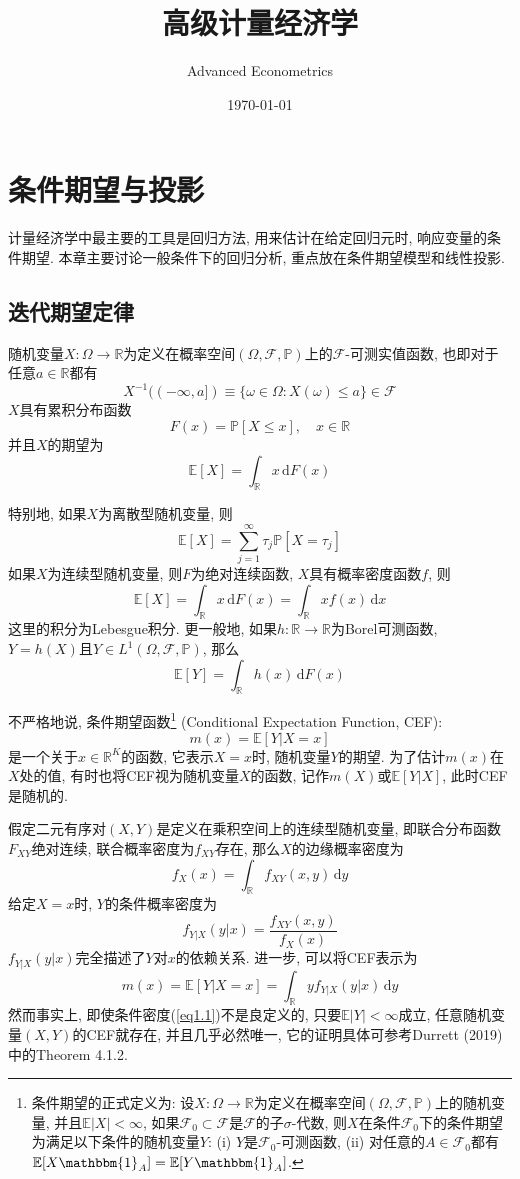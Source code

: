 \documentclass[cn, 12pt, math=mtpro2, bibstyle=apa, blue, twocol]{elegantbook}
\title{高级计量经济学}
\subtitle{Advanced Econometrics}
\date{\today}
\newcommand{\F}{\mathscr{F}}
\newcommand{\R}{\mathbb{R}}
\newcommand{\E}{\mathbb{E}}
\newcommand{\PP}{\mathbb{P}}
\begin{document}
\maketitle
\frontmatter

\tableofcontents

\mainmatter
\chapter{条件期望与投影}
计量经济学中最主要的工具是回归方法, 用来估计在给定回归元时, 响应变量的条件期望. 本章主要讨论一般条件下的回归分析, 重点放在条件期望模型和线性投影.
\section{迭代期望定律}
随机变量$X:\Omega\to\R$为定义在概率空间$(\Omega,\F,\PP)$上的$\F$-可测实值函数, 也即对于任意$a\in\R$都有
$$X^{-1}((-\infty,a])\equiv \{\omega\in\Omega: X(\omega)\leq a\}\in\F$$
$X$具有累积分布函数
$$F(x)=\PP[X\leq x],\quad x\in\R$$
并且$X$的期望为
$$\E[X]=\int_\R x\,\text{d}F(x)$$

特别地, 如果$X$为离散型随机变量, 则
$$\E[X]=\sum_{j=1}^{\infty}\tau_j\PP[X=\tau_j]$$
如果$X$为连续型随机变量, 则$F$为绝对连续函数, $X$具有概率密度函数$f$, 则
$$\E[X]=\int_\R x\,\text{d}F(x)=\int_\R xf(x)\,\text{d}x$$
这里的积分为Lebesgue积分. 更一般地, 如果$h:\R\to\R$为Borel可测函数, $Y=h(X)$且$Y\in L^1(\Omega,\F,\PP)$, 那么
$$\displaystyle\E[Y]=\int_\R h(x)\,\text{d}F(x)$$

不严格地说, 条件期望函数\footnote{条件期望的正式定义为: 设$X:\Omega\to\R$为定义在概率空间$(\Omega,\F,\PP)$上的随机变量, 并且$\E|X|<\infty$, 如果$\mathscr{F}_0\subset\F$是$\F$的子$\sigma$-代数, 则$X$在条件$\mathscr{F}_0$下的条件期望为满足以下条件的随机变量$Y$: (i) $Y$是$\mathscr{F}_0$-可测函数, (ii) 对任意的$A\in\mathscr{F}_0$都有$\E[X\mathbbm{1}_A]=\E[Y\mathbbm{1}_A]$.} (Conditional Expectation Function, CEF):
$$m(x)=\E[Y|X=x]$$
是一个关于$x\in\R^K$的函数, 它表示$X=x$时, 随机变量$Y$的期望. 为了估计$m(x)$在$X$处的值, 有时也将CEF视为随机变量$X$的函数, 记作$m(X)$或$\E[Y|X]$, 此时CEF是随机的.

假定二元有序对$(X,Y)$是定义在乘积空间上的连续型随机变量, 即联合分布函数$F_{XY}$绝对连续, 联合概率密度为$f_{XY}$存在, 那么$X$的边缘概率密度为
$$f_X(x)=\int_\R f_{XY}(x,y)\,\text{d}y$$
给定$X=x$时, $Y$的条件概率密度为
\begin{equation}\label{eq1.1}
  f_{Y|X}(y|x)=\frac{f_{XY}(x,y)}{f_X(x)}
\end{equation}
$f_{Y|X}(y|x)$完全描述了$Y$对$x$的依赖关系. 进一步, 可以将CEF表示为
$$m(x)=\E[Y|X=x]=\int_\R yf_{Y|X}(y|x)\,\text{d}y$$
然而事实上, 即使条件密度(\ref{eq1.1})不是良定义的, 只要$\E|Y|<\infty$成立, 任意随机变量$(X,Y)$的CEF就存在, 并且几乎必然唯一, 它的证明具体可参考Durrett (2019)中的Theorem 4.1.2.
\end{document}
